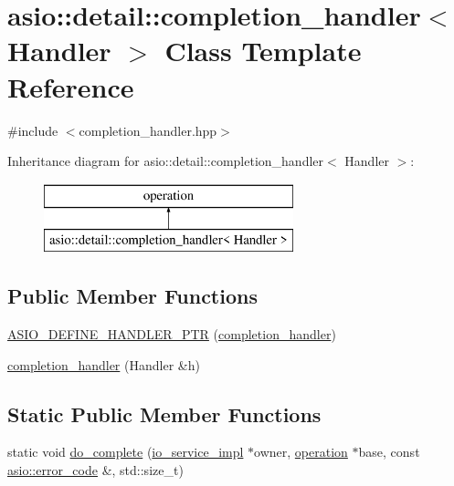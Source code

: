 \hypertarget{classasio_1_1detail_1_1completion__handler}{}\section{asio\+:\+:detail\+:\+:completion\+\_\+handler$<$ Handler $>$ Class Template Reference}
\label{classasio_1_1detail_1_1completion__handler}


{\ttfamily \#include $<$completion\+\_\+handler.\+hpp$>$}

Inheritance diagram for asio\+:\+:detail\+:\+:completion\+\_\+handler$<$ Handler $>$\+:\begin{figure}[H]
\begin{center}
\leavevmode
\includegraphics[height=2.000000cm]{classasio_1_1detail_1_1completion__handler}
\end{center}
\end{figure}
\subsection*{Public Member Functions}
\begin{DoxyCompactItemize}
\item 
\hyperlink{classasio_1_1detail_1_1completion__handler_aeb14b0bb16021feb3f1aa60e1bc9c59e}{A\+S\+I\+O\+\_\+\+D\+E\+F\+I\+N\+E\+\_\+\+H\+A\+N\+D\+L\+E\+R\+\_\+\+P\+T\+R} (\hyperlink{classasio_1_1detail_1_1completion__handler}{completion\+\_\+handler})
\item 
\hyperlink{classasio_1_1detail_1_1completion__handler_ad9252a0c07c63105bb8168382a048dc5}{completion\+\_\+handler} (Handler \&h)
\end{DoxyCompactItemize}
\subsection*{Static Public Member Functions}
\begin{DoxyCompactItemize}
\item 
static void \hyperlink{classasio_1_1detail_1_1completion__handler_a70f5ea2015e0bb3128b2eb30eab2897e}{do\+\_\+complete} (\hyperlink{namespaceasio_1_1detail_a6d61d9b8e53c11288be549d82aec5a42}{io\+\_\+service\+\_\+impl} $\ast$owner, \hyperlink{namespaceasio_1_1detail_a338968609bec20e37145309f8f9ec936}{operation} $\ast$base, const \hyperlink{classasio_1_1error__code}{asio\+::error\+\_\+code} \&, std\+::size\+\_\+t)
\end{DoxyCompactItemize}


